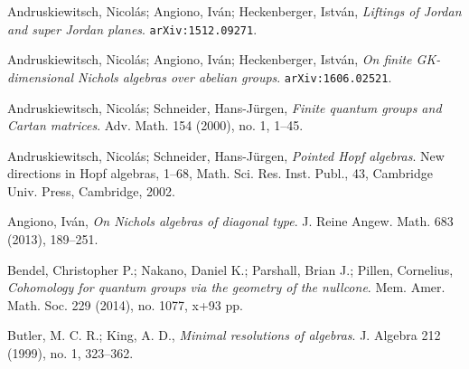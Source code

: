 \documentclass[a4paper,oneside,fleqn,11pt]{report}
\theoremstyle{definition}
\theoremstyle{definition}
\theoremstyle{definition}
\begin{document}
\begin{thebibliography}{999999}

 Andruskiewitsch, Nicolás; Angiono, Iván; Heckenberger, István, \textit{Liftings of Jordan and super Jordan planes}. \texttt{arXiv:1512.09271}.

 Andruskiewitsch, Nicolás; Angiono, Iván; Heckenberger, István, \textit{On finite GK-dimensional Nichols algebras over abelian groups}. \texttt{arXiv:1606.02521}.


 Andruskiewitsch, Nicolás; Schneider, Hans-Jürgen,
\textit{Finite quantum groups and Cartan matrices}. Adv. Math. 154 (2000), no. 1, 1–45. 


 Andruskiewitsch, Nicolás; Schneider, Hans-Jürgen,
\textit{Pointed Hopf algebras}. New directions in Hopf algebras, 1–68, 
Math. Sci. Res. Inst. Publ., 43, Cambridge Univ. Press, Cambridge, 2002. 


 Angiono, Iván, \textit{On Nichols algebras of diagonal type}.
J. Reine Angew. Math. 683 (2013), 189–251. 


 Bendel, Christopher P.; Nakano, Daniel K.; Parshall, Brian J.; Pillen, Cornelius,
\textit{Cohomology for quantum groups via the geometry of the nullcone}. 
Mem. Amer. Math. Soc. 229 (2014), no. 1077, x+93 pp.


 Butler, M. C. R.; King, A. D., \textit{Minimal resolutions of algebras}. 
J. Algebra 212 (1999), no. 1, 323–362.


\end{thebibliography}
\end{document}
